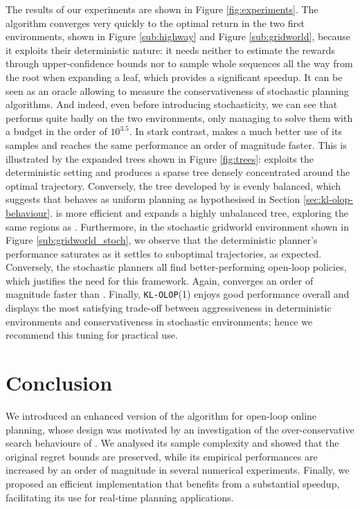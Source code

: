 \documentclass[runningheads, envcountsame, a4paper]{llncs}
\begin{document}
The results of our experiments are shown in Figure \ref{fig:experiments}. The \OPD algorithm converges very quickly to the optimal return in the two first environments, shown in Figure \ref{sub:highway} and Figure \ref{sub:gridworld}, because it exploits their deterministic nature: it needs neither to estimate the rewards through upper-confidence bounds nor to sample whole sequences all the way from the root when expanding a leaf, which provides a significant speedup. It can be seen as an oracle allowing to measure the conservativeness of stochastic planning algorithms. And indeed, even before introducing stochasticity, we can see that \OLOP performs quite badly on the two environments, only managing to solve them with a budget in the order of $10^{3.5}$. In stark contrast, \KLOLOP makes a much better use of its samples and reaches the same performance an order of magnitude faster. This is illustrated by the expanded trees shown in Figure \ref{fig:trees}: \OPD exploits the deterministic setting and produces a sparse tree densely concentrated around the optimal trajectory. Conversely, the tree developed by \OLOP is evenly balanced, which suggests that \OLOP behaves as uniform planning as hypothesised in Section \ref{sec:kl-olop-behaviour}. \KLOLOP is more efficient and expands a highly unbalanced tree, exploring the same regions as \OPD. Furthermore, in the stochastic gridworld environment shown in Figure \ref{sub:gridworld_stoch}, we observe that the deterministic \OPD planner's performance saturates as it settles to suboptimal trajectories, as expected. Conversely, the stochastic planners all find better-performing open-loop policies, which justifies the need for this framework. Again, \KLOLOP converges an order of magnitude faster than \OLOP. Finally, \texttt{KL-OLOP}(1) enjoys good performance overall and displays the most satisfying trade-off between aggressiveness in deterministic environments and conservativeness in stochastic environments; hence we recommend this tuning for practical use.

\section{Conclusion}

We introduced an enhanced version of the \OLOP algorithm for open-loop online planning, whose design was motivated by an investigation of the over-conservative search behaviours of \OLOP. We analysed its sample complexity and showed that the original regret bounds are preserved, while its empirical performances are increased by an order of magnitude in several numerical experiments. Finally, we proposed an efficient implementation that benefits from a substantial speedup, facilitating its use for real-time planning applications.
\end{document}
